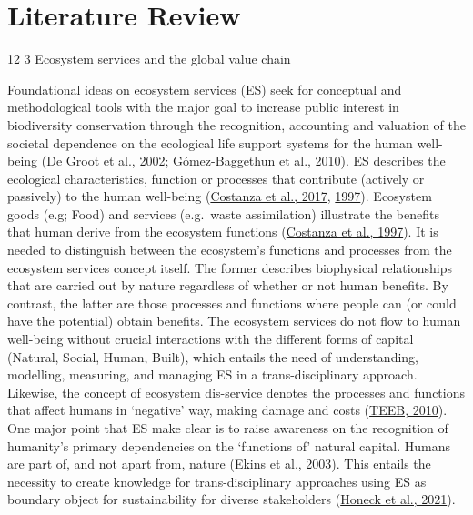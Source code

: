 \documentclass[]{elsarticle} %
\makeatletter
\renewcommand\subsection{\@startsection{subsection}{2}{\z@}%
         {12\p@ \@plus 6\p@ \@minus 3\p@}%
         {3\p@ \@plus 6\p@ \@minus 3\p@}%
         {\normalfont\normalsize\itshape\bfseries}}
\makeatother
\begin{document}
\hypertarget{literature-review}{%
\section{Literature Review}\label{literature-review}}

\label{background}

\hypertarget{ecosystem-services-and-the-global-value-chain}{%
\subsection{Ecosystem services and the global value chain}\label{ecosystem-services-and-the-global-value-chain}}

Foundational ideas on ecosystem services (ES) seek for conceptual and methodological tools with the major goal to increase public interest in biodiversity conservation through the recognition, accounting and valuation of the societal dependence on the ecological life support systems for the human well-being (\protect\hyperlink{ref-DeGroot2002}{De Groot et al., 2002}; \protect\hyperlink{ref-Gomez-Baggethun2010}{Gómez-Baggethun et al., 2010}).
ES describes the ecological characteristics, function or processes that contribute (actively or passively) to the human well-being (\protect\hyperlink{ref-Costanza2017}{Costanza et al., 2017}, \protect\hyperlink{ref-Costanza1997}{1997}).
Ecosystem goods (e.g; Food) and services (e.g.~waste assimilation) illustrate the benefits that human derive from the ecosystem functions (\protect\hyperlink{ref-Costanza1997}{Costanza et al., 1997}).
It is needed to distinguish between the ecosystem's functions and processes from the ecosystem services concept itself.
The former describes biophysical relationships that are carried out by nature regardless of whether or not human benefits.
By contrast, the latter are those processes and functions where people can (or could have the potential) obtain benefits.
The ecosystem services do not flow to human well-being without crucial interactions with the different forms of capital (Natural, Social, Human, Built), which entails the need of understanding, modelling, measuring, and managing ES in a trans-disciplinary approach.
Likewise, the concept of ecosystem dis-service denotes the processes and functions that affect humans in `negative' way, making damage and costs (\protect\hyperlink{ref-TEEB2010}{TEEB, 2010}).
One major point that ES make clear is to raise awareness on the recognition of humanity's primary dependencies on the `functions of' natural capital. Humans are part of, and not apart from, nature (\protect\hyperlink{ref-Ekins2003}{Ekins et al., 2003}).
This entails the necessity to create knowledge for trans-disciplinary approaches using ES as boundary object for sustainability for diverse stakeholders (\protect\hyperlink{ref-Honeck2021}{Honeck et al., 2021}).
\end{document}
